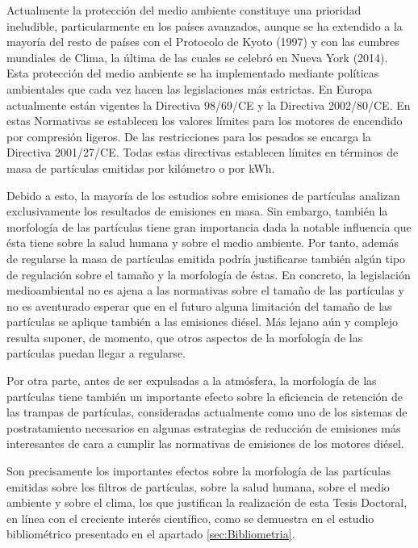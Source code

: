\par Actualmente la protección del medio ambiente constituye una prioridad ineludible, particularmente en los países avanzados, aunque se ha extendido a la mayoría del resto de países con el Protocolo de Kyoto (1997) y con las cumbres mundiales de Clima, la última de las cuales se celebró en Nueva York (2014). Esta protección del medio ambiente se ha implementado mediante políticas ambientales que cada vez hacen las legislaciones más estrictas. En Europa actualmente están vigentes la Directiva 98/69/CE y la Directiva 2002/80/CE. En estas Normativas se establecen los valores límites para los motores de encendido por compresión ligeros. De las restricciones para los pesados se encarga la Directiva 2001/27/CE. Todas estas directivas establecen límites en términos de masa de partículas emitidas por kilómetro o por kWh.

\par Debido a esto, la mayoría de los estudios sobre emisiones de  partículas analizan exclusivamente los resultados de emisiones en masa. Sin embargo, también la  morfología de las partículas tiene gran importancia dada la notable influencia que ésta tiene sobre la salud humana y sobre el medio ambiente. Por tanto, además de regularse la masa de partículas emitida podría justificarse también algún tipo de regulación sobre el tamaño y la morfología de éstas. En concreto, la legislación medioambiental no es ajena a las normativas sobre el tamaño de las partículas y no es aventurado esperar que en el futuro alguna limitación del tamaño de las partículas se aplique también a las emisiones diésel. Más lejano aún y complejo resulta suponer, de momento, que otros aspectos de la morfología de las partículas puedan llegar a regularse.

\par Por otra parte, antes de ser expulsadas a la atmósfera, la morfología de las partículas tiene también un importante efecto sobre la eficiencia de retención de las  trampas de partículas, consideradas actualmente como uno de los sistemas de postratamiento necesarios en algunas estrategias de reducción de emisiones más interesantes de cara a cumplir las normativas de emisiones de los motores diésel.

\par Son precisamente los importantes efectos sobre la morfología de las partículas emitidas sobre los filtros de partículas, sobre la salud humana, sobre el medio ambiente y sobre el clima, los que justifican la realización de esta Tesis Doctoral, en línea con el creciente interés científico, como se demuestra en el estudio bibliométrico presentado en el apartado \ref{sec:Bibliometria}.

